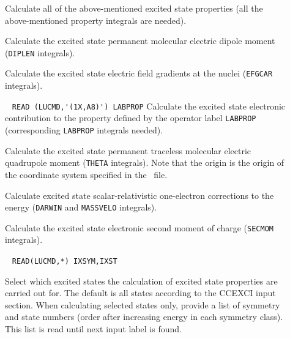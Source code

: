 \begin{description}
\item[]
        Calculate all of the above-mentioned excited state properties (all the
        above-mentioned property integrals are needed).
%
\item[]
        Calculate the excited state permanent molecular electric dipole moment
        (\verb+DIPLEN+ integrals).
%
\item[]
        Calculate the excited state electric field gradients at the nuclei
        (\verb+EFGCAR+ integrals).
%
\item[] \verb| |\newline
\verb|READ (LUCMD,'(1X,A8)') LABPROP|\newline
        Calculate the excited state electronic contribution to the property defined
        by the operator label \verb+LABPROP+ (corresponding
        \verb+LABPROP+ integrals needed).

\item[]
        Calculate the excited state permanent traceless molecular electric
        quadrupole moment (\verb+THETA+ integrals). Note that the
        origin is the origin of the coordinate system specified
        in the \molinp\ file.
%
\item[]
        Calculate excited state scalar-relativistic one-electron
        corrections to the 
        energy (\verb+DARWIN+ and \verb+MASSVELO+ integrals).
%
\item[]
        Calculate the excited state electronic second moment of charge
        (\verb+SECMOM+ integrals).
%

\item[]  \verb| |\newline
\verb|READ(LUCMD,*) IXSYM,IXST|

Select which excited states the calculation of excited state properties 
are carried out for. The default is all states according to the CCEXCI input section.
When calculating selected states only,
provide a list of symmetry and state numbers (order after increasing energy in
each symmetry class).
This list is read until next input label is found.



\end{description}

